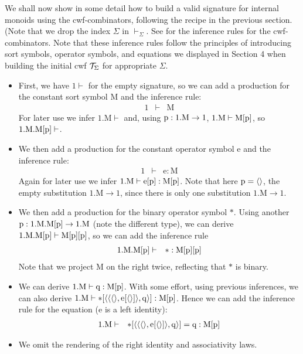 \documentclass{lmcs}
\def\Mon{\mathrm{M}}
\def\idmon{\mathrm{e}}
\def\comp{\mathrm{*}}
\begin{document}

We shall now show in some detail how to build a valid signature for internal monoids 
using the cwf-combinators, following the recipe in the previous section. 
(Note that we drop the index $\Sigma$ in $\vdash_\Sigma$. See \cite{CCD} for
the inference rules for the cwf-combinators. 
Note that these inference rules follow the principles of introducing sort symbols, operator symbols, and equations we displayed in Section 4 when building the initial cwf ${\mathcal T}_\Sigma$ for appropriate $\Sigma$.

\begin{itemize}
\item 
First, we have $1 \vdash$ for the empty signature, so we can 
add a production for the constant sort symbol $\Mon$ and the inference rule:
\begin{eqnarray*}
1 &\vdash& \Mon
\end{eqnarray*}
For later use we infer $1.\Mon \vdash$ and, using $\p:1.\Mon \to 1$, $1.\Mon\vdash\Mon[\p]$,
so $1.\Mon.\Mon[\p] \vdash$.
\item
We then add a production for the constant operator symbol $\idmon$ and the inference rule:
\begin{eqnarray*}
1 &\vdash& \idmon : \Mon
\end{eqnarray*}
Again for later use we infer $1.\Mon\vdash \idmon[\p] :\Mon[\p]$.
Note that here $\mathrm{p} = \langle  \rangle$, the empty substitution $1.\Mon \to 1$,
since there is only one substitution $1.\Mon \to 1$.
\item
We then add a production for the binary operator symbol $\comp$. 
Using another $\p: 1.\Mon.\Mon[\p] \to 1.\Mon$ (note the different type), 
we can derive $1.\Mon.\Mon[\p] \vdash \Mon[\p][\p]$, so we can add the inference rule
\begin{eqnarray*}
1.\Mon.\Mon[\p] &\vdash& \comp : \Mon[\p][\p]
\end{eqnarray*}
Note that we project $\Mon$ on the right twice, reflecting that $\comp$ is binary.
\item
We can derive $1.\Mon \vdash \q : \Mon[\p]$. With some effort,
using previous inferences, we can also derive 
$1.\Mon \vdash \comp[\tuple{\tuple{\tuple{},\idmon[\tuple{}]},\q}] : \Mon[\p]$.
Hence we can add the inference rule for the equation ($\idmon$ is a left identity):
\begin{eqnarray*}
1.\Mon &\vdash& \comp[\tuple{\tuple{\tuple{},\idmon[\tuple{}]},\q}] = \q : \Mon[\p]
\end{eqnarray*}
\item
We omit the rendering of the right identity and associativity laws.
\end{itemize}
\end{document}
